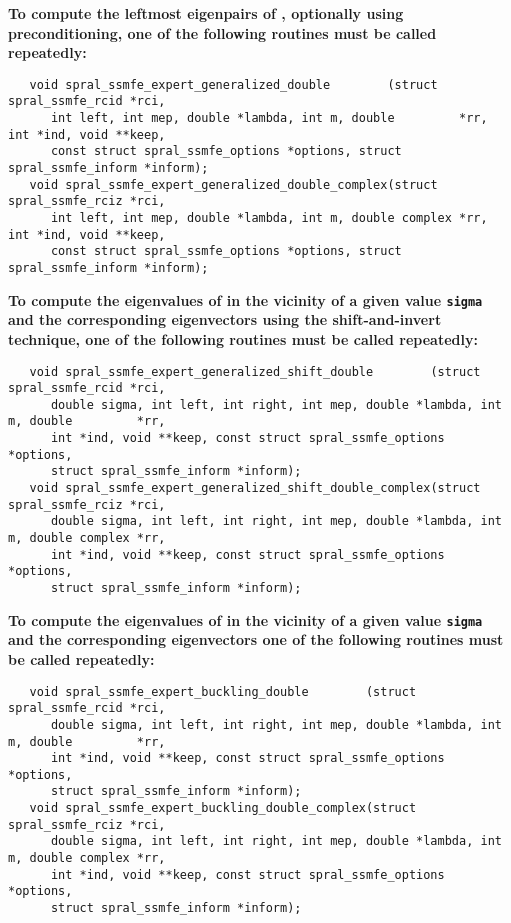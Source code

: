 \medskip
\noindent
{\bf
To compute the leftmost eigenpairs of ,
optionally using preconditioning,
one of the following routines must be called repeatedly:
}
\begin{verbatim}
   void spral_ssmfe_expert_generalized_double        (struct spral_ssmfe_rcid *rci,
      int left, int mep, double *lambda, int m, double         *rr, int *ind, void **keep,
      const struct spral_ssmfe_options *options, struct spral_ssmfe_inform *inform);
   void spral_ssmfe_expert_generalized_double_complex(struct spral_ssmfe_rciz *rci,
      int left, int mep, double *lambda, int m, double complex *rr, int *ind, void **keep,
      const struct spral_ssmfe_options *options, struct spral_ssmfe_inform *inform);
\end{verbatim}

\medskip
\noindent
{\bf
To compute the eigenvalues of  %
in the vicinity of 
a given value {\tt sigma}
and the corresponding eigenvectors using the shift-and-invert technique,
one of the following routines must be called repeatedly:
}
\begin{verbatim}
   void spral_ssmfe_expert_generalized_shift_double        (struct spral_ssmfe_rcid *rci,
      double sigma, int left, int right, int mep, double *lambda, int m, double         *rr,
      int *ind, void **keep, const struct spral_ssmfe_options *options,
      struct spral_ssmfe_inform *inform);
   void spral_ssmfe_expert_generalized_shift_double_complex(struct spral_ssmfe_rciz *rci,
      double sigma, int left, int right, int mep, double *lambda, int m, double complex *rr,
      int *ind, void **keep, const struct spral_ssmfe_options *options,
      struct spral_ssmfe_inform *inform);
\end{verbatim}

\medskip
\noindent
{\bf
To compute the eigenvalues of 
in the vicinity of a given value {\tt sigma}
and the corresponding eigenvectors 
one of the following routines must be called repeatedly:
}
\begin{verbatim}
   void spral_ssmfe_expert_buckling_double        (struct spral_ssmfe_rcid *rci,
      double sigma, int left, int right, int mep, double *lambda, int m, double         *rr,
      int *ind, void **keep, const struct spral_ssmfe_options *options,
      struct spral_ssmfe_inform *inform);
   void spral_ssmfe_expert_buckling_double_complex(struct spral_ssmfe_rciz *rci,
      double sigma, int left, int right, int mep, double *lambda, int m, double complex *rr,
      int *ind, void **keep, const struct spral_ssmfe_options *options,
      struct spral_ssmfe_inform *inform);
\end{verbatim}

